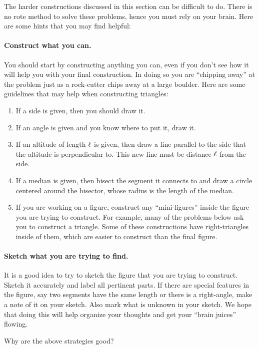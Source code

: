 The harder constructions discussed in this section can be difficult to
do. There is no rote method to solve these problems, hence you must
rely on your brain. Here are some hints that you may find helpful:

\paragraph{Construct what you can.} 
You should start by constructing anything you can, even if you don't
see how it will help you with your final construction. In doing so you
are ``chipping away'' at the problem just as a rock-cutter chips away
at a large boulder. Here are some guidelines that may help when
constructing triangles:
\begin{enumerate}
\item If a side is given, then you should draw it.
\item If an angle is given and you know where to put it, draw it.
\item If an altitude of length $\ell$ is given, then draw a line
  parallel to the side that the altitude is perpendicular to. This new
  line must be distance $\ell$ from the side.
\item If a median is given, then bisect the segment it connects to and
  draw a circle centered around the bisector, whose radius is the
  length of the median.
\item If you are working on a figure, construct any ``mini-figures''
  inside the figure you are trying to construct. For example, many of
  the problems below ask you to construct a triangle. Some of these
  constructions have right-triangles inside of them, which are easier
  to construct than the final figure.
\end{enumerate}



\paragraph{Sketch what you are trying to find.} 
It is a good idea to try to sketch the figure that you are trying to
construct. Sketch it accurately and label all pertinent parts. If
there are special features in the figure, say two segments have the
same length or there is a right-angle, make a note of it on your
sketch. Also mark what is unknown in your sketch. We hope that doing
this will help organize your thoughts and get your ``brain juices''
flowing.

\begin{ques} Why are the above strategies good?
\end{ques}
\QM

